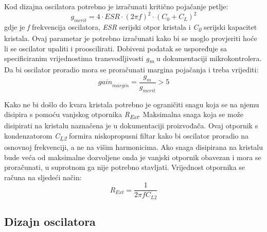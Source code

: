 Kod dizajna oscilatora potrebno je izračunati kritično pojačanje petlje:
\begin{equation} \label{eq:GMCRIT}
    g_{mcrit}=4\cdot ESR \cdot {(2\pi f)}^2\cdot {(C_0 + C_L)}^2
\end{equation}
gdje je \textit{f} frekvencija oscilatora, \textit{ESR} serijski otpor kristala i \textit{C\textsubscript{0}} serijski kapacitet kristala. Ovaj parametar je potrebno izračunati kako bi se moglo provjeriti hoće li se oscilator upaliti i prooscilirati. Dobiveni podatak se uspoređuje sa specificiranim vrijednostima transvodljivosti \textit{g\textsubscript{m}} u dokumentaciji mikrokontrolera. Da bi oscilator proradio mora se proračunati margina pojačanja i treba vrijediti:
\begin{equation} \label{eq:GMARGIN}
    {gain}_{margin}=\frac{g_m}{g_{mcrit}}>5
\end{equation}

Kako ne bi došlo do kvara kristala potrebno je ograničiti snagu koja se na njemu disipira s pomoću vanjskog otpornika \textit{R\textsubscript{Ext}}. Maksimalna snaga koja se može disipirati na kristalu naznačena je u dokumentaciji proizvođača. Ovaj otpornik s kondenzatorom \textit{C\textsubscript{L2}} formira niskopropusni filtar kako bi oscilator proradio na osnovnoj frekvenciji, a ne na višim harmonicima. Ako snaga disipirana na kristalu bude veća od maksimalne dozvoljene onda je vanjski otpornik obavezan i mora se proračunati, u suprotnom ga nije potrebno stavljati. Vrijednost otpornika se računa na sljedeći način:
\begin{equation} \label{eq:REXT}
    R_{Ext}=\frac{1}{2\pi f C_{L2}}
\end{equation}

\subsection{Dizajn oscilatora}

